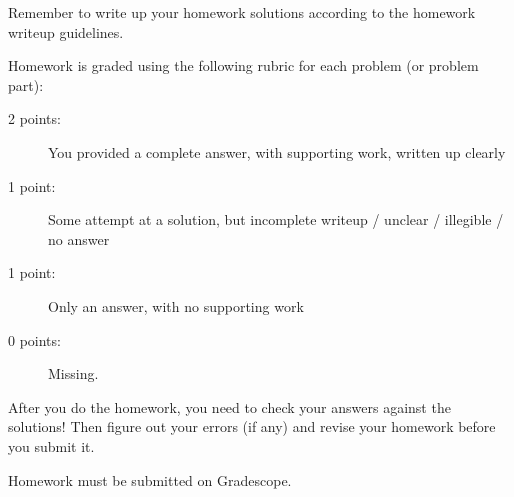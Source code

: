 \documentclass[11pt, oneside]{article}   	%
\begin{document}
\hrulefill

Remember to write up your homework solutions according to the homework writeup guidelines. 

Homework is graded using the following rubric for each problem (or problem part):

\begin{description}
\item[2 points:] You provided a complete answer, with supporting work, written up clearly
\item[1 point:] Some attempt at a solution, but incomplete writeup / unclear / illegible / no answer
\item[1 point:] Only an answer, with no supporting work 
\item[0 points:] Missing.
\end{description}

After you do the homework, you need to check your answers against the solutions! Then figure out your errors (if any) and revise your homework before you submit it. 

Homework must be submitted on Gradescope.
\end{document}
